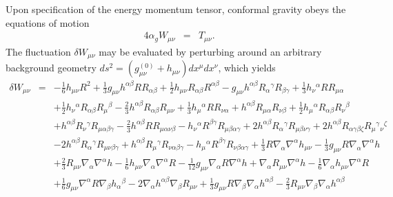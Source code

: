 \documentclass[10pt,letterpaper]{article}
\numberwithin{equation}{section}
\begin{document}
Upon specification of the energy momentum tensor, conformal gravity obeys the equations of motion
\begin{eqnarray}
4\alpha_g W_{\mu\nu} &=& T_{\mu\nu}. 
\end{eqnarray}
The fluctuation $\delta W_{\mu\nu}$ may be evaluated by perturbing around an arbitrary background geometry $ds^2 = (g_{\mu\nu}^{(0)}+h_{\mu\nu})dx^\mu dx^\nu$, which yields
\begin{eqnarray}
\delta W_{\mu\nu} &=&  - \tfrac{1}{6} h_{\mu \nu } R^2 + \tfrac{1}{3} g_{\mu \nu } h^{\alpha \beta } R R_{\alpha \beta } + \tfrac{1}{2} h_{\mu \nu } R_{\alpha \beta } R^{\alpha \beta } -  g_{\mu \nu } h^{\alpha \beta } R_{\alpha }{}^{\gamma } R_{\beta \gamma } + \tfrac{1}{3} h_{\nu }{}^{\alpha } R R_{\mu \alpha } \nonumber \\ 
&& + \tfrac{1}{2} h_{\nu }{}^{\alpha } R_{\alpha \beta } R_{\mu }{}^{\beta } -  \tfrac{2}{3} h^{\alpha \beta } R_{\alpha \beta } R_{\mu \nu } + \tfrac{1}{3} h_{\mu }{}^{\alpha } R R_{\nu \alpha } + h^{\alpha \beta } R_{\mu \alpha } R_{\nu \beta } + \tfrac{1}{2} h_{\mu }{}^{\alpha } R_{\alpha \beta } R_{\nu }{}^{\beta } \nonumber \\ 
&& + h^{\alpha \beta } R_{\nu }{}^{\gamma } R_{\mu \alpha \beta \gamma } -  \tfrac{2}{3} h^{\alpha \beta } R R_{\mu \alpha \nu \beta } -  h_{\nu }{}^{\alpha } R^{\beta \gamma } R_{\mu \beta \alpha \gamma } + 2 h^{\alpha \beta } R_{\alpha }{}^{\gamma } R_{\mu \beta \nu \gamma } + 2 h^{\alpha \beta } R_{\alpha \gamma \beta \zeta } R_{\mu }{}^{\gamma }{}_{\nu }{}^{\zeta } \nonumber \\ 
&& - 2 h^{\alpha \beta } R_{\alpha }{}^{\gamma } R_{\mu \nu \beta \gamma } + h^{\alpha \beta } R_{\mu }{}^{\gamma } R_{\nu \alpha \beta \gamma } -  h_{\mu }{}^{\alpha } R^{\beta \gamma } R_{\nu \beta \alpha \gamma } + \tfrac{1}{3} R \nabla_{\alpha }\nabla^{\alpha }h_{\mu \nu } -  \tfrac{1}{3} g_{\mu \nu } R \nabla_{\alpha }\nabla^{\alpha }h \nonumber \\ 
&& + \tfrac{2}{3} R_{\mu \nu } \nabla_{\alpha }\nabla^{\alpha }h -  \tfrac{1}{6} h_{\mu \nu } \nabla_{\alpha }\nabla^{\alpha }R -  \tfrac{1}{12} g_{\mu \nu } \nabla_{\alpha }R \nabla^{\alpha }h + \nabla_{\alpha }R_{\mu \nu } \nabla^{\alpha }h -  \tfrac{1}{6} \nabla_{\alpha }h_{\mu \nu } \nabla^{\alpha }R \nonumber \\ 
&& + \tfrac{1}{6} g_{\mu \nu } \nabla^{\alpha }R \nabla_{\beta }h_{\alpha }{}^{\beta } - 2 \nabla_{\alpha }h^{\alpha \beta } \nabla_{\beta }R_{\mu \nu } + \tfrac{1}{3} g_{\mu \nu } R \nabla_{\beta }\nabla_{\alpha }h^{\alpha \beta } -  \tfrac{2}{3} R_{\mu \nu } \nabla_{\beta }\nabla_{\alpha }h^{\alpha \beta } \nonumber \\ 

\end{eqnarray}
\end{document}
